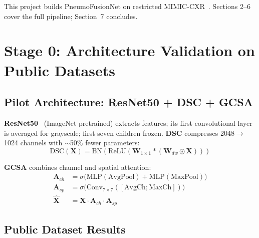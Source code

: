\documentclass{article}
\begin{document}
This project builds PneumoFusionNet on restricted MIMIC-CXR~\cite{johnson2019mimic}.
Sections 2--6 cover the full pipeline; Section~7 concludes.

\section{Stage 0: Architecture Validation on Public Datasets}

\subsection{Pilot Architecture: ResNet50 + DSC + GCSA}

\textbf{ResNet50}~\cite{he2016resnet} (ImageNet pretrained) extracts features;
its first convolutional layer is averaged for grayscale; first seven children frozen.
\textbf{DSC} compresses 2048$\to$1024 channels with $\sim$50\% fewer parameters:
\vspace{-2pt}
\begin{equation}
  \text{DSC}(\mathbf{X})=\text{BN}\!\left(\text{ReLU}\!\left(
    \mathbf{W}_{1\times1}\ast(\mathbf{W}_{dw}\circledast\mathbf{X})
  \right)\right) \label{eq:dsc}
\end{equation}
\vspace{-6pt}

\textbf{GCSA} combines channel and spatial attention:
\vspace{-4pt}
\begin{align}
  \mathbf{A}_{ch}&=\sigma\!\bigl(\text{MLP}(\text{AvgPool})+\text{MLP}(\text{MaxPool})\bigr)\label{eq:ach}\\
  \mathbf{A}_{sp}&=\sigma\!\bigl(\text{Conv}_{7\times7}([\text{AvgCh};\text{MaxCh}])\bigr)\label{eq:asp}\\
  \hat{\mathbf{X}}&=\mathbf{X}\cdot\mathbf{A}_{ch}\cdot\mathbf{A}_{sp}\label{eq:gcsa}
\end{align}
\vspace{-4pt}

\subsection{Public Dataset Results}
\end{document}
